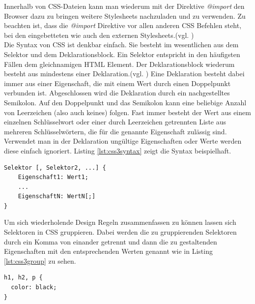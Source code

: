 \documentclass[12pt,a4paper,bibliography=totocnumbered,listof=totocnumbered]{scrartcl}
\begin{document}
Innerhalb von CSS-Dateien kann man wiederum mit der Direktive \textit{@import} den Browser dazu zu bringen weitere Stylesheets nachzuladen und zu verwenden. Zu beachten ist, dass die \textit{@import} Direktive vor allen anderen CSS Befehlen steht, bei den eingebetteten wie auch den externen Stylesheets.(vgl. \cite[S.20]{MeyeCasc2005})\\
Die Syntax von CSS ist denkbar einfach. Sie besteht im wesentlichen aus dem Selektor und dem Deklarationsblock. Ein Selektor entspricht in den häufigsten Fällen dem gleichnamigen HTML Element. Der Deklarationsblock wiederum besteht aus mindestens einer Deklaration.(vgl. \cite[S.26]{MeyeCasc2005}) \glqq Eine Deklaration besteht dabei immer aus einer Eigenschaft, die mit einem Wert durch einen Doppelpunkt verbunden ist. Abgeschlossen wird die Deklaration durch ein nachgestelltes Semikolon. Auf den Doppelpunkt und das Semikolon kann eine beliebige Anzahl von Leerzeichen (also auch keines) folgen. Fast immer besteht der Wert aus einem einzelnen Schlüsselwort oder einer durch Leerzeichen getrennten Liste aus mehreren Schlüsselwörtern, die für die genannte Eigenschaft zulässig sind.\grqq{}\cite[S.28]{MeyeCasc2005} Verwendet man in der Deklaration ungültige Eigenschaften oder Werte werden diese einfach ignoriert. Listing \ref{lst:css3syntax} zeigt die Syntax beispielhaft.

	\vspace{1em}
	\begin{lstlisting}[caption=CSS3 Syntax Beispiel, label=lst:css3syntax]
Selektor [, Selektor2, ...] {
    Eigenschaft1: Wert1;
    ...
    EigenschaftN: WertN[;]
}
	\end{lstlisting}

Um sich wiederholende Design Regeln zusammenfassen zu können lassen sich Selektoren in CSS gruppieren. Dabei werden die zu gruppierenden Selektoren durch ein Komma von einander getrennt und dann die zu gestaltenden Eigenschaften mit den entsprechenden Werten genannt wie in Listing \ref{lst:css3group} zu sehen.

	\vspace{1em}
	\begin{lstlisting}[caption=CSS3 Gruppierung, label=lst:css3group]
h1, h2, p {
  color: black;
}
	\end{lstlisting}
\end{document}
